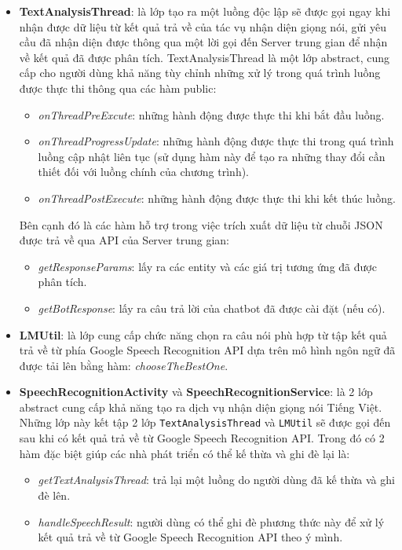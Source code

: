 \documentclass[12pt]{report}
\begin{document}
\begin{itemize}
	\item \textbf{TextAnalysisThread}: là lớp tạo ra một luồng độc lập sẽ được gọi ngay khi nhận được dữ liệu từ kết quả trả về của tác vụ nhận diện giọng nói, gửi yêu cầu đã nhận diện được thông qua một lời gọi đến Server trung gian để nhận về kết quả đã được phân tích.
	TextAnalysisThread là một lớp abstract, cung cấp cho người dùng khả năng tùy chỉnh những xử lý trong quá trình luồng được thực thi thông qua các hàm public:
	\begin{itemize}
		\item \textit{onThreadPreExcute}: những hành động được thực thi khi bắt đầu luồng.
		\item \textit{onThreadProgressUpdate}: những hành động được thực thi trong quá trình luồng cập nhật liên tục (sử dụng hàm này để tạo ra những thay đổi cần thiết đối với luồng chính của chương trình).
		\item \textit{onThreadPostExecute}: những hành động được thực thi khi kết thúc luồng.
	\end{itemize}
	Bên cạnh đó là các hàm hỗ trợ trong việc trích xuất dữ liệu từ chuỗi JSON được trả về qua API của Server trung gian:
	\begin{itemize}
		\item \textit{getResponseParams}: lấy ra các entity và các giá trị tương ứng đã được phân tích.
		\item \textit{getBotResponse}: lấy ra câu trả lời của chatbot đã được cài đặt (nếu có).
	\end{itemize}
	\item \textbf{LMUtil}: là lớp cung cấp chức năng chọn ra câu nói phù hợp từ tập kết quả trả về từ phía Google Speech Recognition API dựa trên mô hình ngôn ngữ đã được tải lên bằng hàm: \textit{chooseTheBestOne}.
	\item \textbf{SpeechRecognitionActivity} và \textbf{SpeechRecognitionService}: là 2 lớp abstract cung cấp khả năng tạo ra dịch vụ nhận diện giọng nói Tiếng Việt. Những lớp này kết tập 2 lớp \texttt{TextAnalysisThread} và \texttt{LMUtil} sẽ được gọi đến sau khi có kết quả trả về từ Google Speech Recognition API. Trong đó có 2 hàm đặc biệt giúp các nhà phát triển có thể kế thừa và ghi đè lại là:
	\begin{itemize}
		\item \textit{getTextAnalysisThread}: trả lại một luồng do người dùng đã kế thừa và ghi đè lên.
		\item \textit{handleSpeechResult}: người dùng có thể ghi đè phương thức này để xử lý kết quả trả về từ Google Speech Recognition API theo ý mình.
	\end{itemize}
\end{itemize}
\end{document}
